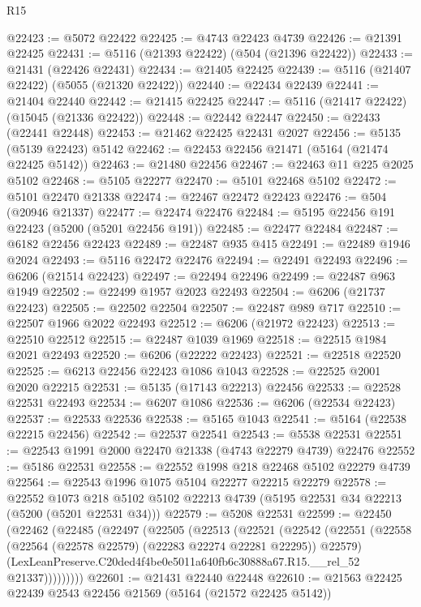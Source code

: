 \begin{lexlean}{R15}
\begin{coremodule}
{{{{{{{{{{{@22423 := @5072 @22422
@22425 := @4743 @22423 @4739
@22426 := @21391 @22425
@22431 := @5116 (@21393 @22422) (@504 (@21396 @22422))
@22433 := @21431 (@22426 @22431)
@22434 := @21405 @22425
@22439 := @5116 (@21407 @22422) (@5055 (@21320 @22422))
@22440 := @22434 @22439
@22441 := @21404 @22440
@22442 := @21415 @22425
@22447 := @5116 (@21417 @22422) (@15045 (@21336 @22422))
@22448 := @22442 @22447
@22450 := @22433 (@22441 @22448)
@22453 := @21462 @22425 @22431 @2027
@22456 := @5135 (@5139 @22423) @5142
@22462 := @22453 @22456 @21471 (@5164 (@21474 @22425 @5142))
@22463 := @21480 @22456
@22467 := @22463 @11 @225 @2025 @5102
@22468 := @5105 @22277
@22470 := @5101 @22468 @5102
@22472 := @5101 @22470 @21338
@22474 := @22467 @22472 @22423
@22476 := @504 (@20946 @21337)
@22477 := @22474 @22476
@22484 := @5195 @22456 @191 @22423 (@5200 (@5201 @22456 @191))
@22485 := @22477 @22484
@22487 := @6182 @22456 @22423
@22489 := @22487 @935 @415
@22491 := @22489 @1946 @2024
@22493 := @5116 @22472 @22476
@22494 := @22491 @22493
@22496 := @6206 (@21514 @22423)
@22497 := @22494 @22496
@22499 := @22487 @963 @1949
@22502 := @22499 @1957 @2023 @22493
@22504 := @6206 (@21737 @22423)
@22505 := @22502 @22504
@22507 := @22487 @989 @717
@22510 := @22507 @1966 @2022 @22493
@22512 := @6206 (@21972 @22423)
@22513 := @22510 @22512
@22515 := @22487 @1039 @1969
@22518 := @22515 @1984 @2021 @22493
@22520 := @6206 (@22222 @22423)
@22521 := @22518 @22520
@22525 := @6213 @22456 @22423 @1086 @1043
@22528 := @22525 @2001 @2020 @22215
@22531 := @5135 (@17143 @22213) @22456
@22533 := @22528 @22531 @22493
@22534 := @6207 @1086
@22536 := @6206 (@22534 @22423)
@22537 := @22533 @22536
@22538 := @5165 @1043
@22541 := @5164 (@22538 @22215 @22456)
@22542 := @22537 @22541
@22543 := @5538 @22531
@22551 := @22543 @1991 @2000 @22470 @21338 (@4743 @22279 @4739) @22476
@22552 := @5186 @22531
@22558 := @22552 @1998 @218 @22468 @5102 @22279 @4739
@22564 := @22543 @1996 @1075 @5104 @22277 @22215 @22279
@22578 := @22552
    @1073
    @218
    @5102
    @5102
    @22213
    @4739
    (@5195 @22531 @34 @22213 (@5200 (@5201 @22531 @34)))
@22579 := @5208 @22531
@22599 := @22450
    (@22462
      (@22485
        (@22497
          (@22505
            (@22513
              (@22521
                (@22542
                  (@22551
                    (@22558 (@22564 (@22578 @22579) (@22283 @22274 @22281 @22295)) @22579)
                    (LexLeanPreserve.C20ded4f4be0e5011a640fb6c30888a67.R15.__rel_52 @21337)))))))))
@22601 := @21431 @22440 @22448
@22610 := @21563 @22425 @22439 @2543 @22456 @21569 (@5164 (@21572 @22425 @5142))
}}}}}}}}}}}
\end{coremodule}
\end{lexlean}
